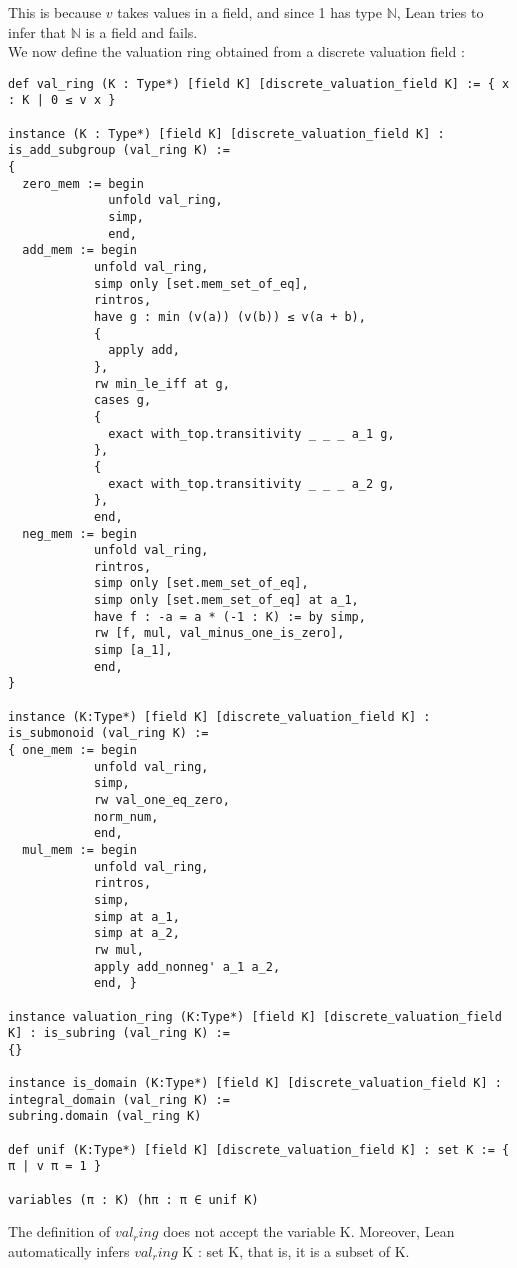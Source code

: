 \documentclass[10pt, a4paper]{article}
\begin{document}
This is because $v$ takes values in a field, and since 1 has type $\mathbb{N}$, Lean tries to infer that $\mathbb{N}$ is a field and fails. \\

We now define the valuation ring obtained from a discrete valuation field : 

\begin{lstlisting}
def val_ring (K : Type*) [field K] [discrete_valuation_field K] := { x : K | 0 ≤ v x } 

instance (K : Type*) [field K] [discrete_valuation_field K] : is_add_subgroup (val_ring K) :=
{
  zero_mem := begin
              unfold val_ring,
              simp,
              end,
  add_mem := begin
            unfold val_ring,
            simp only [set.mem_set_of_eq],
            rintros,
            have g : min (v(a)) (v(b)) ≤ v(a + b),
            {
              apply add,
            },
            rw min_le_iff at g,
            cases g,
            {
              exact with_top.transitivity _ _ _ a_1 g,
            },
            {
              exact with_top.transitivity _ _ _ a_2 g,
            },
            end,
  neg_mem := begin
            unfold val_ring,
            rintros,
            simp only [set.mem_set_of_eq],
            simp only [set.mem_set_of_eq] at a_1,
            have f : -a = a * (-1 : K) := by simp,
            rw [f, mul, val_minus_one_is_zero],
            simp [a_1], 
            end,
}

instance (K:Type*) [field K] [discrete_valuation_field K] : is_submonoid (val_ring K) :=
{ one_mem := begin
            unfold val_ring,
            simp,
            rw val_one_eq_zero,
            norm_num,
            end,
  mul_mem := begin
            unfold val_ring,
            rintros,
            simp,
            simp at a_1,
            simp at a_2,
            rw mul,
            apply add_nonneg' a_1 a_2,
            end, }

instance valuation_ring (K:Type*) [field K] [discrete_valuation_field K] : is_subring (val_ring K) :=
{}

instance is_domain (K:Type*) [field K] [discrete_valuation_field K] : integral_domain (val_ring K) :=
subring.domain (val_ring K)

def unif (K:Type*) [field K] [discrete_valuation_field K] : set K := { π | v π = 1 }

variables (π : K) (hπ : π ∈ unif K)
\end{lstlisting}

The definition of $val_ring$ does not accept the variable K. Moreover, Lean automatically infers $val_ring$ K : set K, that is, it is a subset of K. \\
\end{document}
